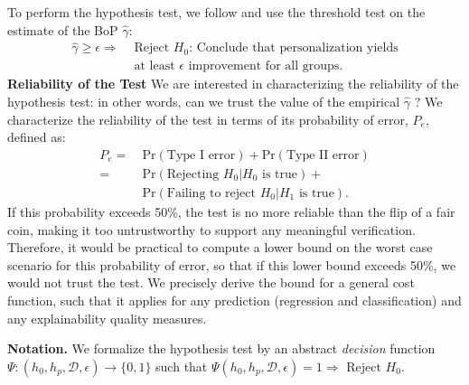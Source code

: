 To perform the hypothesis test, we follow \citep{monteiro2022epistemic} and use the threshold test on the estimate of the BoP $\hat \gamma$:
\begin{align*}
    \hat \gamma \geq \epsilon \Rightarrow & \text{ Reject $H_0$: Conclude that personalization yields} \\ & \text{ at least $\epsilon$ improvement for all groups.}
\end{align*}
\textbf{Reliability of the Test} We are interested in characterizing the reliability of the hypothesis test: in other words, can we trust the value of the empirical $\hat \gamma$ ? We characterize the reliability of the test in terms of its probability of error, $P_e$, defined as:
\begin{align*}
    P_e 
    = &
    \ \text{Pr}(\text{Type I error}) 
    + 
    \text{Pr}(\text{Type II error})
\\
    = &
    \ \text{Pr}(\text{Rejecting $H_0$} | \text{$H_0$ is true}) + \\
    & 
    \ \text{Pr}(\text{Failing to reject $H_0$} | \text{$H_1$ is true}).
\end{align*}
If this probability exceeds 50\%, the test is no more reliable than the flip of a fair coin, making it too untrustworthy to support any meaningful verification. Therefore, it would be practical to compute a lower bound on the worst case scenario for this probability of error, so that if this lower bound exceeds 50\%, we would not trust the test. We precisely derive the bound for a general cost function, such that it applies for any prediction (regression and classification) and any explainability quality measures. 

\begin{tcolorbox}[
    colback=white,
    colframe=black,
    boxrule=0.5pt,
    left=5pt,
    right=5pt,
    top=5pt,
    bottom=5pt,
    boxsep=0pt,
    arc=10pt,
    outer arc=10pt
]
\textbf{Notation.} We formalize the hypothesis test by an abstract \emph{decision} function $\Psi : (h_0, h_p, \mathcal{D}, \epsilon) \rightarrow \{0,1\}$ such that $
\Psi(h_0, h_p, \mathcal{D}, \epsilon) = 1 \Rightarrow \text{ Reject $H_0$}.$
\end{tcolorbox}


